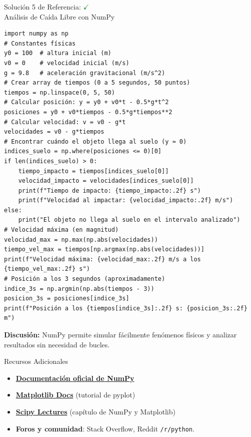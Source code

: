 \documentclass[10pt]{beamer}
\begin{document}
\begin{solutionblock}
\begin{frame}[fragile]{Solución 5 de Referencia: \hfill \textcolor{green}{$\checkmark$} \\ Análisis de Caída Libre con NumPy}
\begin{verbatim}
import numpy as np
# Constantes físicas
y0 = 100  # altura inicial (m)
v0 = 0    # velocidad inicial (m/s)
g = 9.8   # aceleración gravitacional (m/s^2)
# Crear array de tiempos (0 a 5 segundos, 50 puntos)
tiempos = np.linspace(0, 5, 50)
# Calcular posición: y = y0 + v0*t - 0.5*g*t^2
posiciones = y0 + v0*tiempos - 0.5*g*tiempos**2
# Calcular velocidad: v = v0 - g*t
velocidades = v0 - g*tiempos
# Encontrar cuándo el objeto llega al suelo (y ≈ 0)
indices_suelo = np.where(posiciones <= 0)[0]
if len(indices_suelo) > 0:
    tiempo_impacto = tiempos[indices_suelo[0]]
    velocidad_impacto = velocidades[indices_suelo[0]]
    print(f"Tiempo de impacto: {tiempo_impacto:.2f} s")
    print(f"Velocidad al impactar: {velocidad_impacto:.2f} m/s")
else:
    print("El objeto no llega al suelo en el intervalo analizado")
# Velocidad máxima (en magnitud)
velocidad_max = np.max(np.abs(velocidades))
tiempo_vel_max = tiempos[np.argmax(np.abs(velocidades))]
print(f"Velocidad máxima: {velocidad_max:.2f} m/s a los {tiempo_vel_max:.2f} s")
# Posición a los 3 segundos (aproximadamente)
indice_3s = np.argmin(np.abs(tiempos - 3))
posicion_3s = posiciones[indice_3s]
print(f"Posición a los {tiempos[indice_3s]:.2f} s: {posicion_3s:.2f} m")
\end{verbatim}
\textbf{Discusión:} NumPy permite simular fácilmente fenómenos físicos y analizar resultados sin necesidad de bucles.
\end{frame}
\end{solutionblock}


\begin{frame}{Recursos Adicionales}
  \begin{itemize}
    \item \href{https://numpy.org/doc/}{\textbf{Documentación oficial de NumPy}}
    \item \href{https://matplotlib.org/stable/}{\textbf{Matplotlib Docs}} (tutorial de pyplot)
    \item \href{https://scipy-lectures.org/}{\textbf{Scipy Lectures}} (capítulo de NumPy y Matplotlib)
    \item \textbf{Foros y comunidad}: Stack Overflow, Reddit \texttt{/r/python}.
  \end{itemize}
\end{frame}
\end{document}
